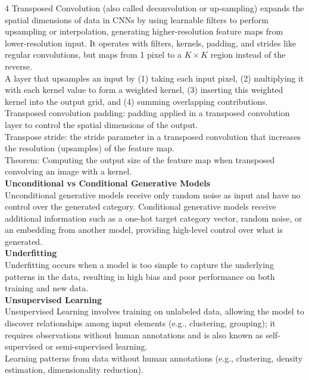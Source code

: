 \documentclass[8pt]{extarticle}
\begin{document}
\begin{multicols}{4}
{Transposed Convolution (also called deconvolution or up-sampling) expands the spatial dimensions of data in CNNs by using learnable filters to perform upsampling or interpolation, generating higher-resolution feature maps from lower-resolution input. It operates with filters, kernels, padding, and strides like regular convolutions, but maps from 1 pixel to a $K\times K$ region instead of the reverse.\\
A layer that upsamples an input by (1) taking each input pixel, (2) multiplying it with each kernel value to form a weighted kernel, (3) inserting this weighted kernel into the output grid, and (4) summing overlapping contributions.\\
Transposed convolution padding: padding applied in a transposed convolution layer to control the spatial dimensions of the output.\\
Transpose stride: the stride parameter in a transposed convolution that increases the resolution (upsamples) of the feature map.\\
Theorem: Computing the output size of the feature map when transposed convolving an image with a kernel.\\
\vspace{2pt}\textbf{Unconditional vs Conditional Generative Models}\\
Unconditional generative models receive only random noise as input and have no control over the generated category. Conditional generative models receive additional information such as a one-hot target category vector, random noise, or an embedding from another model, providing high-level control over what is generated.\\
\vspace{2pt}\textbf{Underfitting}\\
Underfitting occurs when a model is too simple to capture the underlying patterns in the data, resulting in high bias and poor performance on both training and new data.\\
\vspace{2pt}\textbf{Unsupervised Learning}\\
Unsupervised Learning involves training on unlabeled data, allowing the model to discover relationships among input elements (e.g., clustering, grouping); it requires observations without human annotations and is also known as self-supervised or semi-supervised learning.\\
Learning patterns from data without human annotations (e.g., clustering, density estimation, dimensionality reduction).\\
}
\end{multicols}
\end{document}
